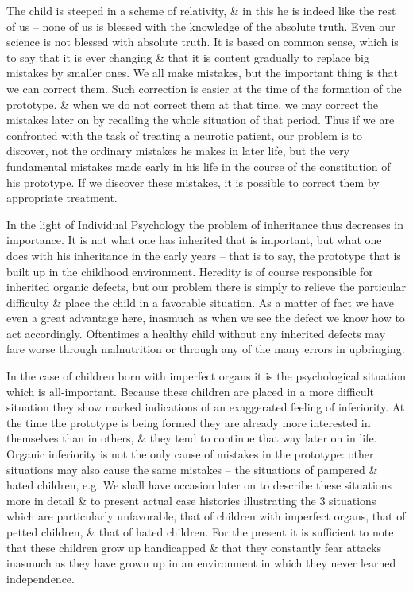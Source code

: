 \documentclass{article}
\numberwithin{equation}{section}
\begin{document}
The child is steeped in a scheme of relativity, \& in this he is indeed like the rest of us -- none of us is blessed with the knowledge of the absolute truth. Even our science is not blessed with absolute truth. It is based on common sense, which is to say that it is ever changing \& that it is content gradually to replace big mistakes by smaller ones. We all make mistakes, but the important thing is that we can correct them. Such correction is easier at the time of the formation of the prototype. \& when we do not correct them at that time, we may correct the mistakes later on by recalling the whole situation of that period. Thus if we are confronted with the task of treating a neurotic patient, our problem is to discover, not the ordinary mistakes he makes in later life, but the very fundamental mistakes made early in his life in the course of the constitution of his prototype. If we discover these mistakes, it is possible to correct them by appropriate treatment.

In the light of Individual Psychology the problem of inheritance thus decreases in importance. It is not what one has inherited that is important, but what one does with his inheritance in the early years -- that is to say, the prototype that is built up in the childhood environment. Heredity is of course responsible for inherited organic defects, but our problem there is simply to relieve the particular difficulty \& place the child in a favorable situation. As a matter of fact we have even a great advantage here, inasmuch as when we see the defect we know how to act accordingly. Oftentimes a healthy child without any inherited defects may fare worse through malnutrition or through any of the many errors in upbringing.

In the case of children born with imperfect organs it is the psychological situation which is all-important. Because these children are placed in a more difficult situation they show marked indications of an exaggerated feeling of inferiority. At the time the prototype is being formed they are already more interested in themselves than in others, \& they tend to continue that way later on in life. Organic inferiority is not the only cause of mistakes in the prototype: other situations may also cause the same mistakes -- the situations of pampered \& hated children, e.g. We shall have occasion later on to describe these situations more in detail \& to present actual case histories illustrating the 3 situations which are particularly unfavorable, that of children with imperfect organs, that of petted children, \& that of hated children. For the present it is sufficient to note that these children grow up handicapped \& that they constantly fear attacks inasmuch as they have grown up in an environment in which they never learned independence.
\end{document}

